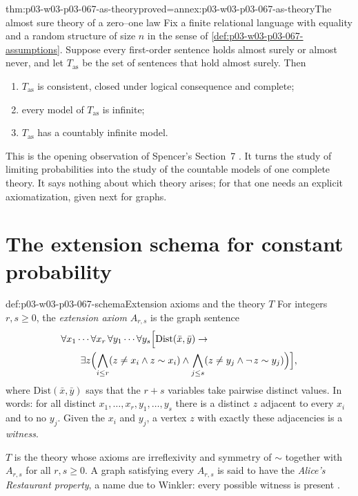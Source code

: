 \begin{hbtheorem}{thm:p03-w03-p03-067-as-theory}{proved=annex:p03-w03-p03-067-as-theory}{The almost sure theory of a zero--one law}
Fix a finite relational language with equality and a random structure of
size \(n\) in the sense of \cref{def:p03-w03-p03-067-assumptions}.  Suppose
every first-order sentence holds almost surely or almost never, and let
\(T_{\mathrm{as}}\) be the set of sentences that hold almost surely.  Then
\begin{enumerate}
\item \(T_{\mathrm{as}}\) is consistent, closed under logical consequence and
  complete;
\item every model of \(T_{\mathrm{as}}\) is infinite;
\item \(T_{\mathrm{as}}\) has a countably infinite model.
\end{enumerate}
\end{hbtheorem}

This is the opening observation of Spencer's Section~7
\cite[p.~13]{Spencer2007LogicRandomStructuresAuthor}.  It turns the study of
limiting probabilities into the study of the countable models of one complete
theory.  It says nothing about which theory arises; for that one needs an
explicit axiomatization, given next for graphs.

\section{The extension schema for constant probability}
\label{sec:p03-w03-p03-067-extension}

\begin{hbdefinition}{def:p03-w03-p03-067-schema}{Extension axioms and the theory \(T\)}
For integers \(r,s\geq0\), the \emph{extension axiom} \(A_{r,s}\) is the
graph sentence
\begin{align*}
 &\forall x_1\cdots\forall x_r\,\forall y_1\cdots\forall y_s
 \Bigl[\mathrm{Dist}(\bar x,\bar y)\to\\
 &\qquad\exists z\Bigl(\bigwedge_{i\leq r}(z\neq x_i\land z\sim x_i)
 \land\bigwedge_{j\leq s}(z\neq y_j\land\neg\, z\sim y_j)\Bigr)\Bigr],
\end{align*}
where \(\mathrm{Dist}(\bar x,\bar y)\) says that the \(r+s\) variables take
pairwise distinct values.  In words: for all distinct
\(x_1,\ldots,x_r,y_1,\ldots,y_s\) there is a distinct \(z\) adjacent to every
\(x_i\) and to no \(y_j\).  Given the \(x_i\) and \(y_j\), a vertex \(z\) with
exactly these adjacencies is a \emph{witness}.

\(T\) is the theory whose axioms are irreflexivity and symmetry of \(\sim\)
together with \(A_{r,s}\) for all \(r,s\geq0\).  A graph satisfying every
\(A_{r,s}\) is said to have the \emph{Alice's Restaurant property}, a name due
to Winkler: every possible witness is present
\cite[pp.~12--13]{Spencer2007LogicRandomStructuresAuthor}.
\end{hbdefinition}

